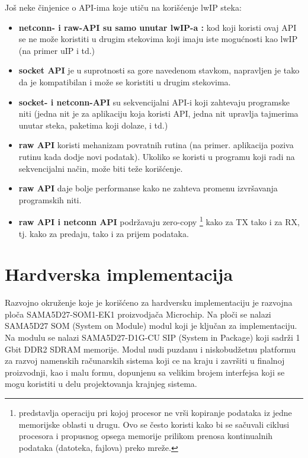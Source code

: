 \documentclass[a4paper,12pt, master]{etf}
\begin{document}
	Jo\v{s} neke \v{c}injenice o API-ima koje uti\v{c}u na kori\v{s}\'{c}enje lwIP steka:
	\begin{itemize}
		\item \textbf{netconn- i raw-API su samo unutar lwIP-a :} kod koji koristi ovaj API se 
		ne mo\v{z}e koristiti u drugim stekovima koji imaju iste mogu\'{c}nosti kao lwIP (na primer 
		uIP i td.)
		\item \textbf{socket API} je u suprotnosti sa gore navedenom stavkom, napravljen je 
		tako da je kompatibilan i mo\v{z}e se koristiti u drugim stekovima.
		\item \textbf{socket- i netconn-API} su sekvencijalni API-i koji zahtevaju programske 
		niti (jedna nit je za aplikaciju koja koristi API, jedna nit upravlja tajmerima unutar 
		steka, paketima koji dolaze, i td.)
		\item \textbf{raw API} koristi mehanizam povratnih rutina (na primer. aplikacija poziva
		rutinu kada dodje novi podatak). Ukoliko se koristi u programu koji radi na 
		sekvencijalni na\v{c}in, mo\v{z}e biti te\v{z}e kori\v{s}\'{c}enje.
		\item \textbf{raw API} daje bolje performanse kako ne zahteva promenu izvr\v{s}avanja
		programskih niti.
		\item \textbf{raw API i netconn API} podr\v{z}avaju zero-copy \footnote{predstavlja 
		operaciju pri kojoj procesor ne vr\v{s}i kopiranje podataka iz jedne memorijske oblasti u 
		drugu. Ovo se \v{c}esto koristi kako bi se sa\v{c}uvali ciklusi procesora i propusnog opsega 
		memorije prilikom prenosa kontinualnih podataka (datoteka, fajlova) preko mre\v{z}e.} kako 
		za TX tako i za RX, tj. kako za predaju, tako i za prijem podataka.
	\end{itemize}

	\newpage

	\chapter{Hardverska implementacija}

	Razvojno okru\v{z}enje koje je kori\v{s}\'{c}eno za hardversku implementaciju je razvojna 
	plo\v{c}a SAMA5D27-SOM1-EK1 proizvodja\v{c}a Microchip. Na plo\v{c}i se nalazi SAMA5D27 
	SOM (System on Module) modul koji je klju\v{c}an za implementaciju. Na modulu se nalazi 
	SAMA5D27-D1G-CU SIP (System in Package) koji sadr\v{z}i 1 Gbit DDR2 SDRAM memorije. Modul 
	nudi puzdanu i niskobud\v{z}etnu platformu	za razvoj namenskih ra\v{c}unarskih sistema 
	koji ce na kraju i zavr\v{s}iti u finalnoj proizvodnji, kao i malu formu, dopunjenu sa 
	velikim brojem interfejsa koji se mogu koristiti u delu projektovanja krajnjeg sistema.
\end{document}
